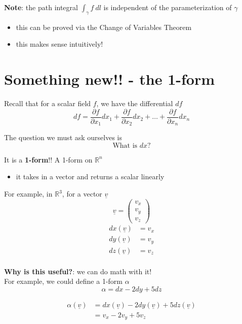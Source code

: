 \textbf{Note}: the path integral $\int_{\gamma} f\ dl$ is independent of the parameterization of $\gamma$
 \begin{itemize}
    \item this can be proved via the Change of Variables Theorem
    \item this makes sense intuitively!
\end{itemize}

\section{Something new!! - the 1-form}

Recall that for a scalar field $f$, we have the differential $df$ 
\[
  df = \frac{\partial f}{\partial x_1} dx_1 + \frac{\partial f}{\partial x_2} dx_2 + \hdots + \frac{\partial f}{\partial x_n} dx_n
\] 

The question we must ask ourselves is
\[
   \text{What is $dx$?}
\] 

It is a \textbf{1-form}!! A 1-form on $ \mathbb{R}^n$
\begin{itemize}
   \item it takes in a vector and returns a scalar linearly
\end{itemize}

For example, in $ \mathbb{R}^3$, for a vector $ \underline{v}$ 
\[
  \underline{v} = \begin{pmatrix} v_x \\ v_y \\ v_z \end{pmatrix} 
\] 
\begin{align*}
   dx \left( \underline{v} \right) & = v_x  \\
   dy \left( \underline{v} \right) & = v_y  \\
   dz \left( \underline{v} \right) & = v_z  \\
\end{align*}

\textbf{Why is this useful?}: we can do math with it! \\

For example, we could define a 1-form $ \alpha$
\[
  \alpha = dx - 2dy + 5dz
\] 

\begin{align*}
   \alpha \left(  \underline{v} \right) & = dx( \underline{v}) - 2dy ( \underline{v}) + 5 dz (\underline{v})  \\
                                        &= v_x - 2v_y + 5v_z
\end{align*}

